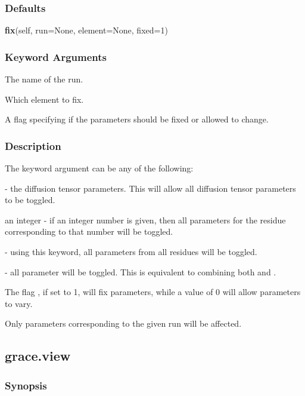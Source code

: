 \subsubsection{Defaults}

\textsf{\textbf{fix}(self, run=None, element=None, fixed=1)}


\subsubsection{Keyword Arguments}

  The name of the run. 

  Which element to fix. 

  A flag specifying if the parameters should be fixed or allowed to change. 




\subsubsection{Description}

The keyword argument  can be any of the following:


 - the diffusion tensor parameters.  This will allow all diffusion tensor parameters to be toggled.


an integer - if an integer number is given, then all parameters for the residue corresponding to that number will be toggled.


 - using this keyword, all parameters from all residues will be toggled.


 - all parameter will be toggled.  This is equivalent to combining both  and .


The flag , if set to 1, will fix parameters, while a value of 0 will allow parameters to vary.


Only parameters corresponding to the given run will be affected.




\newpage

\subsection{grace.view}


\subsubsection{Synopsis}

